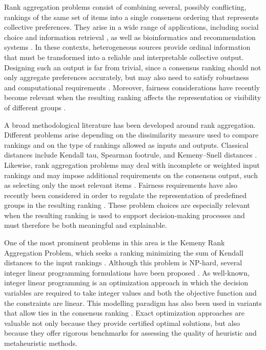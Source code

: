 \documentclass[pdflatex,basic,Numbered]{jnl}%
\theoremstyle{plain}
\theoremstyle{remark}
\theoremstyle{thmstyleone}%
\theoremstyle{thmstylethree}%
\begin{document}
Rank aggregation problems consist of combining several, possibly conflicting, rankings of the same set of items into a single consensus ordering that represents collective preferences. They arise in a wide range of applications, including social choice and information retrieval \cite{dwork2001rank,farah2007outranking}, as well as bioinformatics and recommendation systems \cite{kolde2012robust,balchanowski2023comparative}. In these contexts, heterogeneous sources provide ordinal information that must be transformed into a reliable and interpretable collective output. Designing such an output is far from trivial, since a consensus ranking should not only aggregate preferences accurately, but may also need to satisfy robustness and computational requirements \cite{dong2019alleviating,kuhlman2020rank}. Moreover, fairness considerations have recently become relevant when the resulting ranking affects the representation or visibility of different groups \cite{balestra2024fairmc}.

A broad methodological literature has been developed around rank aggregation. Different problems arise depending on the dissimilarity measure used to compare rankings and on the type of rankings allowed as inputs and outputs. Classical distances include Kendall tau, Spearman footrule, and Kemeny--Snell distances \cite{critchlow1985metric,kumar2010generalized}. Likewise, rank aggregation problems may deal with incomplete or weighted input rankings and may impose additional requirements on the consensus output, such as selecting only the most relevant items \cite{lin2010rank,chen2015spectral}. Fairness requirements have also recently been considered in order to regulate the representation of predefined groups in the resulting ranking \cite{balestra2024fairmc}. These problem choices are especially relevant when the resulting ranking is used to support decision-making processes and must therefore be both meaningful and explainable.

One of the most prominent problems in this area is the Kemeny Rank Aggregation Problem, which seeks a ranking minimizing the sum of Kendall distances to the input rankings \citep{kemeny1962mathematical}. Although this problem is NP-hard, several  integer linear programming formulations have been proposed \citep{ali2012experiments}. As well-known, integer linear programming is an optimization approach in which the decision variables are required to take integer values and both the objective function and the constraints are linear. This modelling paradigm has also been used in variants that allow ties in the consensus ranking \citep{brancotte2015rank, yoo2021new}. Exact optimization approaches are valuable not only because they provide certified optimal solutions, but also because they offer rigorous benchmarks for assessing the quality of heuristic and metaheuristic methods.
\end{document}
